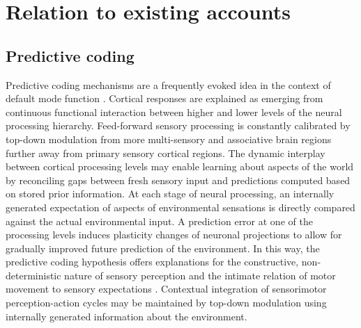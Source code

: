 \documentclass[10pt,letterpaper]{article}
\begin{document}
\section{Relation to existing accounts}

\subsection{Predictive coding}
Predictive coding mechanisms
\citep{clark2013whatever, friston2008hierarchical}
are a frequently evoked idea in the context of default mode function
\citep{bar2007}.
Cortical responses are explained as
emerging from continuous functional interaction between
higher and lower levels of the neural processing hierarchy.
Feed-forward sensory processing is constantly calibrated by
top-down modulation from more multi-sensory and associative brain regions
further away from primary sensory cortical regions.
The dynamic interplay between cortical processing levels
may enable learning about aspects of the world by reconciling
gaps between fresh sensory input and predictions computed
based on stored prior information.
At each stage of neural processing,
an internally generated expectation of aspects of environmental sensations is
directly compared against the actual environmental input.
A prediction error at one of the processing levels
induces plasticity changes of neuronal projections
to allow for gradually improved future prediction of the environment.
In this way,
the predictive coding hypothesis offers explanations for
the constructive, non-deterministic nature of sensory perception
\citep{friston2010free, buzsaki2006rhythms} and
the intimate relation of motor movement to sensory expectations
\citep{wolpert1995internal, kording2004bayesian}.
Contextual integration of sensorimotor perception-action cycles
may be maintained by top-down modulation
using internally generated information about the environment.
\end{document}
